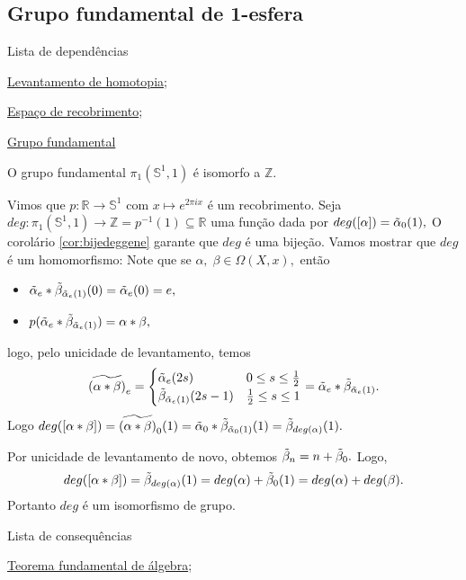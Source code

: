 \subsection{Grupo fundamental de 1-esfera}
\label{grupo-fundamental-de-S1-prop}
\begin{titlemize}{Lista de dependências}
	\item \hyperref[levantamento-de-homotopia-prop]{Levantamento de homotopia};\\ %
	\item \hyperref[espaco-de-recobrimento-def]{Espaço de recobrimento};\\
    \item \hyperref[grupo-fundamental]{Grupo fundamental}
\end{titlemize}

\begin{thm}
    O grupo fundamental $\pi_1(\mathbb{S}^1,1)$ é isomorfo a $\mathbb{Z}.$ 
\end{thm}

\begin{dem}
Vimos que $p:\mathbb{R}\rightarrow \mathbb{S}^1$ com $x\mapsto e^{2\pi i x}$ é um recobrimento. Seja $deg:\pi_1(\mathbb{S}^1,1)\rightarrow \mathbb{Z}=p^{-1}(1)\subseteq \mathbb{R}$ uma função dada por $deg([\alpha])=\Tilde{\alpha}_0(1),$ O corolário \ref{cor:bijedeggene} garante que $deg$ é uma bijeção. Vamos mostrar que $deg$ é um homomorfismo: Note que se $\alpha,\;\beta\in \Omega(X,x),$ então
\begin{itemize}
    \item $\Tilde{\alpha}_e*\Tilde{\beta}_{\Tilde{\alpha}_e (1)}(0)=\Tilde{\alpha}_e(0)=e,$
    \item $p(\Tilde{\alpha}_e*\Tilde{\beta}_{\Tilde{\alpha}_e (1)})=\alpha *\beta,$
\end{itemize}
logo, pelo unicidade de levantamento, temos 
\begin{align*}
\widetilde{(\alpha*\beta)}_e=\begin{cases}
    \Tilde{\alpha}_e (2s)\qquad& 0\le s\le \frac{1}{2}\\
    \Tilde{\beta}_{\Tilde{\alpha}_e (1)}(2s-1)&\frac{1}{2}\le s\le 1
    \end{cases}=\Tilde{\alpha}_e*\Tilde{\beta}_{\Tilde{\alpha}_e (1)}.
\end{align*}
Logo $deg([\alpha*\beta])=\widetilde{(\alpha*\beta)}_0 (1)=\Tilde{\alpha}_0*\Tilde{\beta}_{\Tilde{\alpha}_0 (1)}(1)=\Tilde{\beta}_{deg(\alpha)}(1).$

Por unicidade de levantamento de novo, obtemos $\Tilde{\beta}_n=n+\Tilde{\beta}_0.$ Logo,
\[deg([\alpha*\beta])=\Tilde{\beta}_{deg(\alpha)}(1)=deg(\alpha)+\Tilde{\beta}_0 (1)=deg(\alpha)+deg(\beta).\]
Portanto $deg$ é um isomorfismo de grupo.
\end{dem}

\begin{titlemize}{Lista de consequências}
	\item \hyperref[]{Teorema fundamental de álgebra};\\ %
\end{titlemize}
